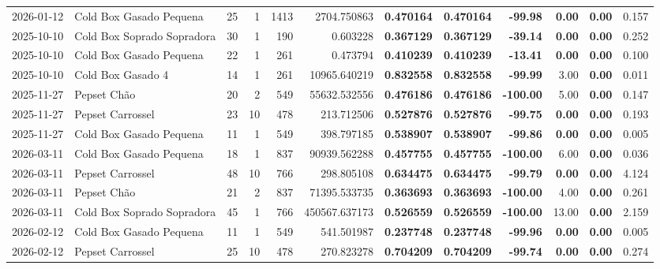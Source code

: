{\begin{center}
{\begin{tabular}{@{}llrrrrrrrrrr@{}}
2026-01-12 & Cold Box Gasado Pequena & 25 & 1 & 1413 & 2704.750863 & \textbf{0.470164} & \textbf{0.470164} & \textbf{-99.98} & \textbf{0.00} & \textbf{0.00} & 0.157 \\
2025-10-10 & Cold Box Soprado Sopradora & 30 & 1 & 190 & 0.603228 & \textbf{0.367129} & \textbf{0.367129} & \textbf{-39.14} & \textbf{0.00} & \textbf{0.00} & 0.252 \\
2025-10-10 & Cold Box Gasado Pequena & 22 & 1 & 261 & 0.473794 & \textbf{0.410239} & \textbf{0.410239} & \textbf{-13.41} & \textbf{0.00} & \textbf{0.00} & 0.100 \\
2025-10-10 & Cold Box Gasado 4 & 14 & 1 & 261 & 10965.640219 & \textbf{0.832558} & \textbf{0.832558} & \textbf{-99.99} & 3.00 & \textbf{0.00} & 0.011 \\
2025-11-27 & Pepset Chão & 20 & 2 & 549 & 55632.532556 & \textbf{0.476186} & \textbf{0.476186} & \textbf{-100.00} & 5.00 & \textbf{0.00} & 0.147 \\
2025-11-27 & Pepset Carrossel & 23 & 10 & 478 & 213.712506 & \textbf{0.527876} & \textbf{0.527876} & \textbf{-99.75} & \textbf{0.00} & \textbf{0.00} & 0.193 \\
2025-11-27 & Cold Box Gasado Pequena & 11 & 1 & 549 & 398.797185 & \textbf{0.538907} & \textbf{0.538907} & \textbf{-99.86} & \textbf{0.00} & \textbf{0.00} & 0.005 \\
2026-03-11 & Cold Box Gasado Pequena & 18 & 1 & 837 & 90939.562288 & \textbf{0.457755} & \textbf{0.457755} & \textbf{-100.00} & 6.00 & \textbf{0.00} & 0.036 \\
2026-03-11 & Pepset Carrossel & 48 & 10 & 766 & 298.805108 & \textbf{0.634475} & \textbf{0.634475} & \textbf{-99.79} & \textbf{0.00} & \textbf{0.00} & 4.124 \\
2026-03-11 & Pepset Chão & 21 & 2 & 837 & 71395.533735 & \textbf{0.363693} & \textbf{0.363693} & \textbf{-100.00} & 4.00 & \textbf{0.00} & 0.261 \\
2026-03-11 & Cold Box Soprado Sopradora & 45 & 1 & 766 & 450567.637173 & \textbf{0.526559} & \textbf{0.526559} & \textbf{-100.00} & 13.00 & \textbf{0.00} & 2.159 \\
2026-02-12 & Cold Box Gasado Pequena & 11 & 1 & 549 & 541.501987 & \textbf{0.237748} & \textbf{0.237748} & \textbf{-99.96} & \textbf{0.00} & \textbf{0.00} & 0.005 \\
2026-02-12 & Pepset Carrossel & 25 & 10 & 478 & 270.823278 & \textbf{0.704209} & \textbf{0.704209} & \textbf{-99.74} & \textbf{0.00} & \textbf{0.00} & 0.274 \\

\end{tabular}}
\end{center}}
